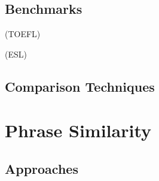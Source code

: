\documentclass[fullname]{clv2}
\begin{document}
\subsection{Benchmarks}
\begin{enumerate*}
\item \cite{radinsky2011word}
\item \cite{RG65:1965}
\item \cite{Landauer:1997} (TOEFL)
\item \cite{finkelstein2001placing}
\item \cite{turney2001mining} (ESL)
\item \cite{jarmasz2012roget}
\item \cite{bruni2012distributional}
\item \cite{luong2013better}
\item \cite{hill2014simlex}
\end{enumerate*}

\subsection{Comparison Techniques}

\begin{enumerate*}
\item \cite{gawron2014improving}
\end{enumerate*}

\section{Phrase Similarity}

\subsection{Approaches}

\begin{enumerate*}
\item \cite{mitchell2009language}
\item \cite{zanzotto2010estimating}
\item \cite{erk2010flexible}
\item \cite{baroni2010nouns}
\item \cite{guevara2010regression}
\item \cite{socher2012semantic}
\item \cite{socher2013parsing}
\item \cite{hashimoto2014jointly}
\item \cite{socher2014grounded}
\item \cite{wieting2015paraphrase}
\item \cite{he2015multi}

\end{enumerate*}
\end{document}
